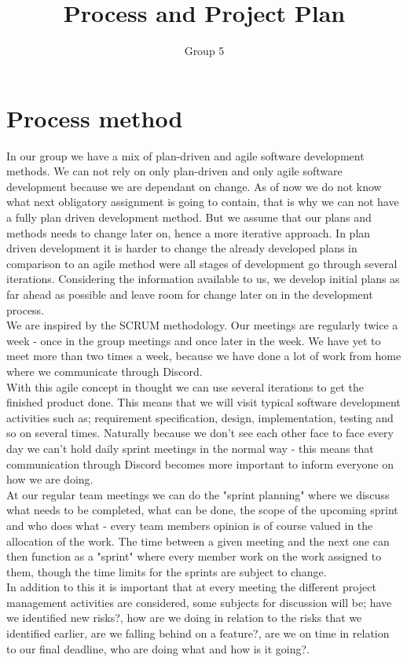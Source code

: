 \documentclass{article}
\title{Process and Project Plan}
\author{Group 5}
\date{}
\begin{document}
    \maketitle

    \section{Process method}
    \noindent
    In our group we have a mix of plan-driven and agile software development methods. We can not rely on only plan-driven and only agile software development because we are dependant on change. As of now we do not know what next obligatory assignment is going to contain, that is why we can not have a fully plan driven development method. But we assume that our plans and methods needs to change later on, hence a more iterative approach. In plan driven development it is harder to change the already developed plans in comparison to an agile method were all stages of development go through several iterations. Considering the information available to us, we develop initial plans as far ahead as possible and leave room for change later on in the development process. \\

    \noindent
    We are inspired by the SCRUM methodology. Our meetings are regularly twice a week - once in the group meetings and once later in the week. We have yet to meet more than two times a week, because we
    have done a lot of work from home where we communicate through Discord. \\
    With this agile concept in thought we can use several iterations to get the finished product done. This means that we will visit typical software development activities such as; requirement specification, design, implementation, testing and so on several times. Naturally because we don't see each other face to face every day we can't hold daily sprint meetings in the normal way - this means that communication through Discord becomes more important to inform everyone on how we are doing. \\
    At our regular team meetings we can do the "sprint planning" where we discuss what needs to be completed, what can be done, the scope of the upcoming sprint and who does what - every team members opinion is of course valued in the allocation of the work. The time between a given meeting and the next one can then function as a "sprint" where every member work on the work assigned to them, though the time limits for the sprints are subject to change. \\
    In addition to this it is important that at every meeting the different project management activities are considered, some subjects for discussion will be; have we identified new risks?, how are we doing in relation to the risks that we identified earlier, are we falling behind on a feature?, are we on time in relation to our final deadline, who are doing what and how is it going?.
\end{document}
